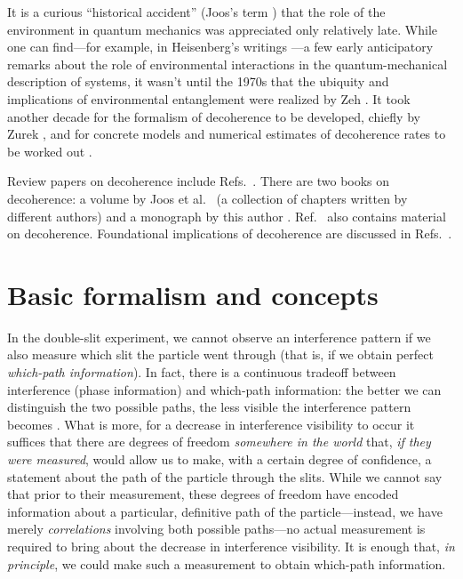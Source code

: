 \documentclass[aps,pra,reprint,amsmath,amssymb,showpacs,nofootinbib,floatfix,onecolumn,12pt]{revtex4-1}
\begin{document}
It is a curious ``historical accident'' (Joos's term \cite[p.~13]{Joos:1999:po}) that the role of the environment in quantum mechanics was appreciated only relatively late. While one can find---for example, in Heisenberg's writings \cite{Schlosshauer:2011:un}---a few early anticipatory remarks about the role of environmental interactions in the quantum-mechanical description of systems, it wasn't until the 1970s that the ubiquity and implications of environmental entanglement were realized by Zeh \cite{Zeh:1970:yt,Kubler:1973:ux}. It took another decade for the formalism of decoherence to be developed, chiefly by Zurek \cite{Zurek:1981:dd,Zurek:1982:tv}, and for concrete models and numerical estimates of decoherence rates to be worked out \cite{Joos:1985:iu,Zurek:1986:uz}. 

Review papers on decoherence include Refs.~\cite{Zurek:2002:ii,Paz:2001:aa,Hornberger:2009:aq,Schlosshauer:2003:tv,Schlosshauer:2019:qd}. There are two books on decoherence: a volume by Joos et al.\ \cite{Joos:2003:jh} (a collection of chapters written by different authors) and a monograph by this author \cite{Schlosshauer:2007:un}. Ref.\ \cite{Breuer:2002:oq} also contains material on decoherence. Foundational implications of decoherence are discussed in Refs.~\cite{Bacciagaluppi:2003:yz,Schlosshauer:2003:tv,Schlosshauer:2006:rw,Schlosshauer:2007:un}. 


\section{\label{sec:form-basic-conc}Basic formalism and concepts}

In the double-slit experiment, we cannot observe an interference pattern if we also measure which slit the particle went through (that is, if we obtain perfect \emph{which-path information}). In fact, there is a continuous tradeoff between interference (phase information) and which-path information: the better we can distinguish the two possible paths, the less visible the interference pattern becomes \cite{Wooters:1979:az}. What is more, for a decrease in interference visibility to occur it suffices that there are degrees of freedom \emph{somewhere in the world} that, \emph{if they were measured}, would allow us to make, with a certain degree of confidence, a statement about the path of the particle through the slits. While we cannot say that prior to their measurement, these degrees of freedom have encoded information about a particular, definitive path of the particle---instead, we have merely \emph{correlations} involving both possible paths---no actual measurement is required to bring about the decrease in interference visibility. It is enough that, \emph{in principle}, we could make such a measurement to obtain which-path information. 
\end{document}
